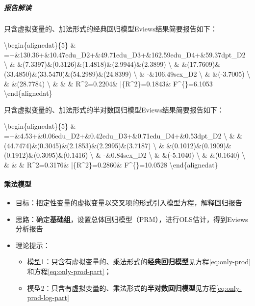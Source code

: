 \documentclass[12pt,(landscape,a4paper),(portrait,a4paper)]{article}
\providecommand{\tightlist}{%
  \setlength{\itemsep}{0pt}\setlength{\parskip}{0pt}}
\let\oldparagraph\paragraph
\renewcommand{\paragraph}[1]{\oldparagraph{#1}\mbox{}}
\let\oldsubparagraph\subparagraph
\renewcommand{\subparagraph}[1]{\oldsubparagraph{#1}\mbox{}}
\theoremstyle{definition}
\theoremstyle{definition}
\theoremstyle{definition}
\theoremstyle{remark}
\begin{document}
\subparagraph{报告解读}

只含虚拟变量的、加法形式的经典回归模型Eviews结果简要报告如下：

\textbackslash{}begin\{alignedat\}\{5\} \&
=+\&130.36+\&10.47edu\_D2+\&49.71edu\_D3+\&162.59edu\_D4+\&59.37dpt\_D2
\textbackslash{} \&
\&(7.3397)\&(0.3126)\&(1.4818)\&(2.9944)\&(2.3899)
\textbackslash{} \&
\&(17.7609)\&(33.4850)\&(33.5470)\&(54.2989)\&(24.8399)
\textbackslash{} \& \quad-\&106.49sex\_D2 \textbackslash{} \&
\&(-3.7005) \textbackslash{} \& \&(28.7784)
\textbackslash{} \& \& \quad\& R\^{}2=0.2204\&
\bar\{R\^{}2\}=0.1843\& F\^{}\{\ast\}=6.1053
\textbackslash{}end\{alignedat\}

只含虚拟变量的、加法形式的半对数回归模型Eviews结果简要报告如下：

\textbackslash{}begin\{alignedat\}\{5\} \&
=+\&4.53+\&0.06edu\_D2+\&0.42edu\_D3+\&0.71edu\_D4+\&0.53dpt\_D2
\textbackslash{} \&
\&(44.7474)\&(0.3045)\&(2.1853)\&(2.2995)\&(3.7187)
\textbackslash{} \&
\&(0.1012)\&(0.1909)\&(0.1912)\&(0.3095)\&(0.1416)
\textbackslash{} \& \quad-\&0.84sex\_D2 \textbackslash{} \&
\&(-5.1040) \textbackslash{} \& \&(0.1640)
\textbackslash{} \& \& \quad\& R\^{}2=0.3176\&
\bar\{R\^{}2\}=0.2860\& F\^{}\{\ast\}=10.0528
\textbackslash{}end\{alignedat\}

\paragraph{乘法模型}

\begin{itemize}
\item
  目标：把定性变量的虚拟变量以交叉项的形式引入模型方程，解释回归报告
\item
  思路：确定\textbf{基础组}，设置总体回归模型（PRM），进行OLS估计，得到Eviews分析报告
\item
  理论提示：

  \begin{itemize}
  \tightlist
  \item
    模型1：只含有虚拟变量的、乘法形式的\textbf{经典回归模型}见方程\eqref{eq:only-prod}和方程\eqref{eq:only-prod-part}；
  \item
    模型2：只含有虚拟变量的、乘法形式的\textbf{半对数回归模型}见方程\eqref{eq:only-prod-log-part}
  \end{itemize}
\end{itemize}
\end{document}
